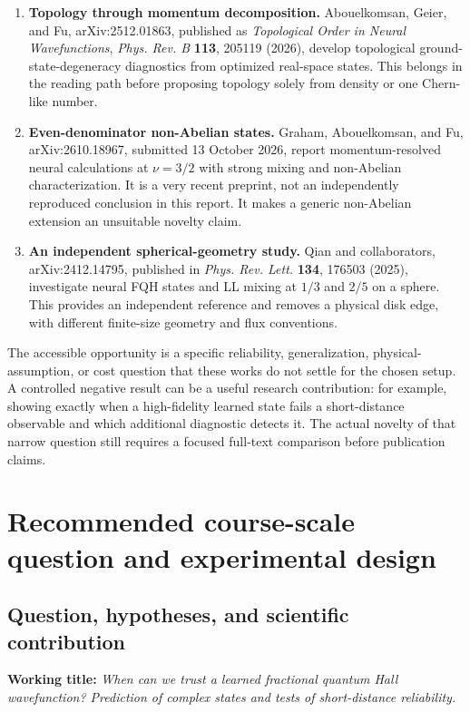 \documentclass[11pt,letterpaper]{article}
\begin{document}
\begin{enumerate}
\item \textbf{Topology through momentum decomposition.} Abouelkomsan, Geier, and Fu, arXiv:2512.01863, published as \emph{Topological Order in Neural Wavefunctions}, \emph{Phys. Rev. B} \textbf{113}, 205119 (2026), develop topological ground-state-degeneracy diagnostics from optimized real-space states. This belongs in the reading path before proposing topology solely from density or one Chern-like number.\cite{deepstate}
\item \textbf{Even-denominator non-Abelian states.} Graham, Abouelkomsan, and Fu, arXiv:2610.18967, submitted 13 October 2026, report momentum-resolved neural calculations at $\nu=3/2$ with strong mixing and non-Abelian characterization. It is a very recent preprint, not an independently reproduced conclusion in this report. It makes a generic non-Abelian extension an unsuitable novelty claim.\cite{graham}
\item \textbf{An independent spherical-geometry study.} Qian and collaborators, arXiv:2412.14795, published in \emph{Phys. Rev. Lett.} \textbf{134}, 176503 (2025), investigate neural FQH states and LL mixing at $1/3$ and $2/5$ on a sphere. This provides an independent reference and removes a physical disk edge, with different finite-size geometry and flux conventions.\cite{qian}
\end{enumerate}

The accessible opportunity is a specific reliability, generalization, physical-assumption, or cost question that these works do not settle for the chosen setup. A controlled negative result can be a useful research contribution: for example, showing exactly when a high-fidelity learned state fails a short-distance observable and which additional diagnostic detects it. The actual novelty of that narrow question still requires a focused full-text comparison before publication claims.

\section{Recommended course-scale question and experimental design}
\label{sec:project}

\subsection{Question, hypotheses, and scientific contribution}

\textbf{Working title:} \emph{When can we trust a learned fractional quantum Hall wavefunction? Prediction of complex states and tests of short-distance reliability.}
\end{document}
